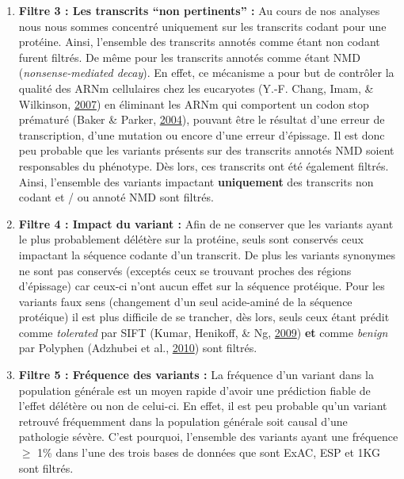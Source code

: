 \documentclass[12pt,twoside]{reedthesis}
\theoremstyle{definition}
\theoremstyle{definition}
\theoremstyle{remark}
\begin{document}
  \begin{enumerate}
  \def\labelenumi{\arabic{enumi}.}
  \setcounter{enumi}{2}
  \item
    \textbf{Filtre 3 : Les transcrits ``non pertinents'' :} Au cours de
    nos analyses nous nous sommes concentré uniquement sur les transcrits
    codant pour une protéine. Ainsi, l'ensemble des transcrits annotés
    comme étant non codant furent filtrés. De même pour les transcrits
    annotés comme étant NMD (\emph{nonsense-mediated decay}). En effet, ce
    mécanisme a pour but de contrôler la qualité des ARNm cellulaires chez
    les eucaryotes (Y.-F. Chang, Imam, \& Wilkinson,
    \protect\hyperlink{ref-Chang2007}{2007}) en éliminant les ARNm qui
    comportent un codon stop prématuré (Baker \& Parker,
    \protect\hyperlink{ref-Baker2004}{2004}), pouvant être le résultat
    d'une erreur de transcription, d'une mutation ou encore d'une erreur
    d'épissage. Il est donc peu probable que les variants présents sur des
    transcrits annotés NMD soient responsables du phénotype. Dès lors, ces
    transcrits ont été également filtrés. Ainsi, l'ensemble des variants
    impactant \textbf{uniquement} des transcrits non codant et / ou annoté
    NMD sont filtrés.
  \item
    \textbf{Filtre 4 : Impact du variant :} Afin de ne conserver que les
    variants ayant le plus probablement délétère sur la protéine, seuls
    sont conservés ceux impactant la séquence codante d'un transcrit. De
    plus les variants synonymes ne sont pas conservés (exceptés ceux se
    trouvant proches des régions d'épissage) car ceux-ci n'ont aucun effet
    sur la séquence protéique. Pour les variants faux sens (changement
    d'un seul acide-aminé de la séquence protéique) il est plus difficile
    de se trancher, dès lors, seuls ceux étant prédit comme
    \emph{tolerated} par SIFT (Kumar, Henikoff, \& Ng,
    \protect\hyperlink{ref-Kumar2009}{2009}) \textbf{et} comme
    \emph{benign} par Polyphen (Adzhubei et al.,
    \protect\hyperlink{ref-Adzhubei2010}{2010}) sont filtrés.
  \item
    \textbf{Filtre 5 : Fréquence des variants :} La fréquence d'un variant
    dans la population générale est un moyen rapide d'avoir une prédiction
    fiable de l'effet délétère ou non de celui-ci. En effet, il est peu
    probable qu'un variant retrouvé fréquemment dans la population
    générale soit causal d'une pathologie sévère. C'est pourquoi,
    l'ensemble des variants ayant une fréquence \(\ge\) 1\% dans l'une des
    trois bases de données que sont ExAC, ESP et 1KG sont filtrés.

\end{enumerate}
\end{document}
